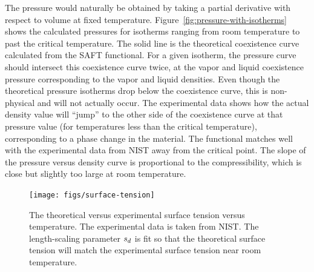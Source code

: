 \documentclass[letterpaper,twocolumn,amsmath,amssymb,prb]{revtex4-1}
\begin{document}
The pressure would naturally be obtained by taking a partial
derivative with respect to volume at fixed temperature. 
Figure~\ref{fig:pressure-with-isotherms} shows the calculated pressures for
isotherms ranging from room temperature to past the critical temperature. The
solid line is the theoretical coexistence curve calculated from the SAFT
functional. For a given isotherm, the pressure curve should intersect this
coexistence curve twice, at the vapor and liquid coexistence 
pressure corresponding to the vapor and liquid densities. Even
though the theoretical pressure isotherms drop below the coexistence curve,
this is non-physical and will not actually occur. The experimental data shows
how the actual density value will ``jump'' to the other side of 
the coexistence curve at that pressure value (for
temperatures less than the critical temperature), corresponding to a phase 
change in the material. The
functional matches well with the experimental data from NIST away from the
critical point. The slope of the pressure versus density curve is proportional
to the compressibility, which is close but slightly too large at room
temperature. 

\begin{figure}
\begin{center}
\texttt{[image: figs/surface-tension]}
\end{center}
\caption{The theoretical versus experimental surface tension
  versus temperature. The experimental data is taken from NIST.\cite{nistwater}
  The length-scaling parameter $s_d$ is fit so that the theoretical surface 
  tension will match the experimental surface tension near room temperature.}
\label{fig:surface-tension}
\end{figure}


\end{document}
